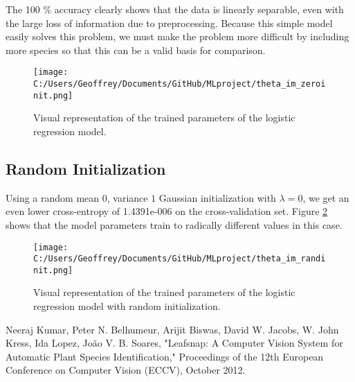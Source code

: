 \documentclass[12pt]{article}
\begin{document}
The 100 \% accuracy clearly shows that the data is linearly separable, even with the large loss of information due to preprocessing. Because this simple model easily solves this problem, we must make the problem more difficult by including more species so that this can be a valid basis for comparison.

\begin{figure} \label{fig:thetaZeroinitLogR}
\begin{center} 
 \texttt{[image: C:/Users/Geoffrey/Documents/GitHub/MLproject/theta\_im\_zeroinit.png]}
\end{center}
\caption{Visual representation of the trained parameters of the logistic regression model.}
\end{figure}

\subsection{Random Initialization} Using a random mean $0$, variance $1$ Gaussian initialization with $\lambda = 0$, we get an even lower cross-entropy of 1.4391e-006 on the cross-validation set. Figure \ref{fig:thetaRandinitLogR} shows that the model parameters train to radically different values in this case.

\begin{figure}
\label{fig:thetaRandinitLogR}
\begin{center}
 \texttt{[image: C:/Users/Geoffrey/Documents/GitHub/MLproject/theta\_im\_randinit.png]}
\end{center}
\caption{Visual representation of the trained parameters of the logistic regression model with random initialization.}
\end{figure}



\begin{thebibliography}{99}
 Neeraj Kumar, Peter N. Belhumeur, Arijit Biswas, David W. Jacobs, W. John Kress, Ida Lopez, Jo\~{a}o V. B. Soares, "Leafsnap: A Computer Vision System for Automatic Plant Species Identification," Proceedings of the 12th European Conference on Computer Vision (ECCV), October 2012.
\end{thebibliography}
\end{document}
